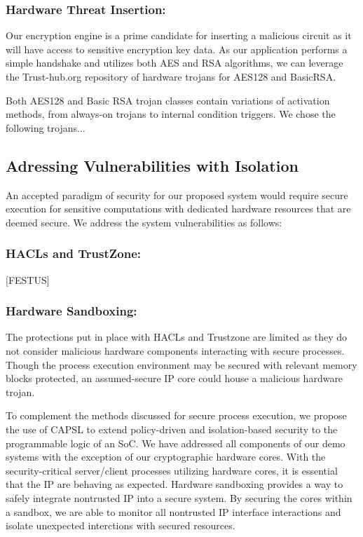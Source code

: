 \documentclass[sigconf]{acmart}
\theoremstyle{plain}
\theoremstyle{remark}
\begin{document}
\subsubsection{Hardware Threat Insertion:}

Our encryption engine is a prime candidate for inserting a malicious circuit as it will have access to sensitive encryption key data. As our application performs a simple handshake and utilizes both AES and RSA algorithms, we can leverage the Trust-hub.org repository of hardware trojans for AES128 and BasicRSA.

Both AES128 and Basic RSA trojan classes contain variations of activation methods, from always-on trojans to internal condition triggers. We chose the following trojans...


\subsection{Adressing Vulnerabilities with Isolation}
An accepted paradigm of security for our proposed system would require secure execution for sensitive computations with dedicated hardware resources that are deemed secure. We address the system vulnerabilities as follows:


\subsubsection{HACLs and TrustZone:}
[FESTUS]

\subsubsection{Hardware Sandboxing:}
The protections put in place with HACLs and Trustzone are limited as they do not consider malicious hardware components interacting with secure processes. Though the process execution environment may be secured with relevant memory blocks protected, an assumed-secure IP core could house a malicious hardware trojan.

To complement the methods discussed for secure process execution, we propose the use of CAPSL to extend policy-driven and isolation-based security to the programmable logic of an SoC. We have addressed all components of our demo systems with the exception of our cryptographic hardware cores. With the security-critical server/client processes utilizing hardware cores, it is essential that the IP are behaving as expected. Hardware sandboxing provides a way to safely integrate nontrusted IP into a secure system. By securing the cores within a sandbox, we are able to monitor all nontrusted IP interface interactions and isolate unexpected interctions with secured resources.
\end{document}
